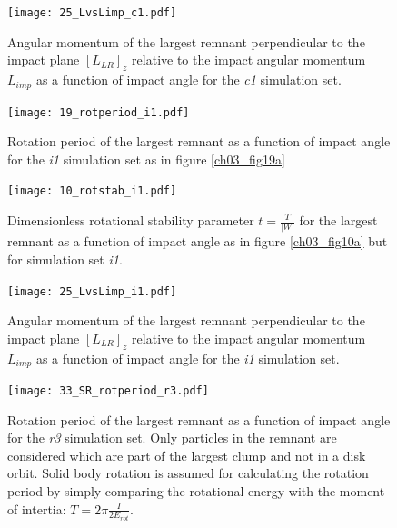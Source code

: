 {\begin{landscape}
\begin{figure}
\begin{center}
\texttt{[image: 25\_LvsLimp\_c1.pdf]}
\caption{Angular momentum of the largest remnant perpendicular to the impact plane $[L_{LR}]_z$ relative to the impact angular momentum $L_{imp}$ as a function of impact angle for the \emph{c1} simulation set.}
\label{ch03_fig25b}
\end{center}
\end{figure}

\begin{figure}
\begin{center}
\texttt{[image: 19\_rotperiod\_i1.pdf]}
\caption{Rotation period of the largest remnant as a function of impact angle for the \emph{i1} simulation set as in figure \ref{ch03_fig19a} }
\label{ch03_fig19c}
\end{center}
\end{figure}

\begin{figure}
\begin{center}
\texttt{[image: 10\_rotstab\_i1.pdf]}
\caption{Dimensionless rotational stability parameter $t = \frac{T}{|W|}$ for the largest remnant as a function of impact angle as in figure \ref{ch03_fig10a} but for simulation set \emph{i1}.}
\label{ch03_fig10c}
\end{center}
\end{figure}

\begin{figure}
\begin{center}
\texttt{[image: 25\_LvsLimp\_i1.pdf]}
\caption{Angular momentum of the largest remnant perpendicular to the impact plane $[L_{LR}]_z$ relative to the impact angular momentum $L_{imp}$ as a function of impact angle for the \emph{i1} simulation set.}
\label{ch03_fig25c}
\end{center}
\end{figure}


\begin{figure}
\begin{center}
\texttt{[image: 33\_SR\_rotperiod\_r3.pdf]}
\caption{Rotation period of the largest remnant as a function of impact angle for the \emph{r3} simulation set. Only particles in the remnant are considered which are part of the largest clump and not in a disk orbit. Solid body rotation is assumed for calculating the rotation period by simply comparing the rotational energy with the moment of intertia: $T = 2 \pi \frac{I}{2 E_{rot}}$.}
\label{ch03_fig33a}
\end{center}
\end{figure}


\end{landscape}}
